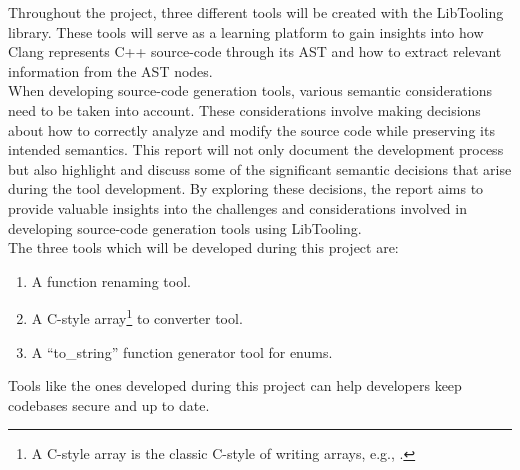 Throughout the project, three different tools will be created with the LibTooling library.
These tools will serve as a learning platform to gain insights into how Clang represents C++ source-code through its AST and how to extract relevant information from the AST nodes.\\
When developing source-code generation tools, various semantic considerations need to be taken into account.
These considerations involve making decisions about how to correctly analyze and modify the source code while preserving its intended semantics.
This report will not only document the development process but also highlight and discuss some of the significant semantic decisions that arise during the tool development.
By exploring these decisions, the report aims to provide valuable insights into the challenges and considerations involved in developing source-code generation tools using LibTooling.\\
The three tools which will be developed during this project are:
\vspace*{-0.75em}
\begin{enumerate}
    \item A function renaming tool.
    \item A C-style array\footnote{A C-style array is the classic C-style of writing arrays, e.g., .} to  converter tool.
    \item A ``to\_string'' function generator tool for enums.
\end{enumerate}
\vspace*{-0.75em}
Tools like the ones developed during this project can help developers keep codebases secure and up to date.